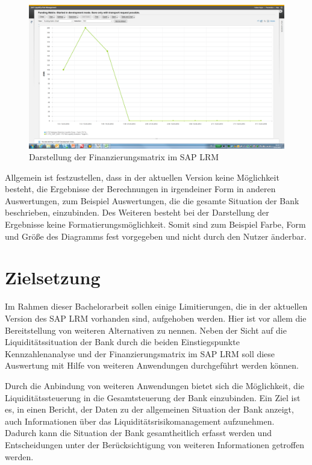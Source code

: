 \begin{onehalfspacing}
\begin{figure}[h]
\centering
\setlength{\unitlength}{1mm}
\includegraphics[width=15cm]{images/Funding_Matrix_Example.png}
\caption{Darstellung der Finanzierungsmatrix im SAP LRM\label{fig:lrm_istzustand_fundingmatrix}}
\end{figure} 

Allgemein ist festzustellen, dass in der aktuellen Version keine Möglichkeit besteht, die Ergebnisse der Berechnungen in irgendeiner Form in anderen Auswertungen, zum Beispiel Auswertungen, die die gesamte Situation der Bank beschrieben, einzubinden. Des Weiteren besteht bei der Darstellung der Ergebnisse keine Formatierungsmöglichkeit. Somit sind zum Beispiel Farbe, Form und Größe des Diagramms fest vorgegeben und nicht durch den Nutzer änderbar.

\section{Zielsetzung}
\label{sec:zielsetzung}

Im Rahmen dieser Bachelorarbeit sollen einige Limitierungen, die in der aktuellen Version des SAP LRM vorhanden sind, aufgehoben werden. Hier ist vor allem die Bereitstellung von weiteren Alternativen zu nennen. Neben der Sicht auf die Liquiditätssituation der Bank durch die beiden Einstiegspunkte Kennzahlenanalyse und der Finanzierungsmatrix im SAP LRM soll diese Auswertung mit Hilfe von weiteren Anwendungen durchgeführt werden können.

Durch die Anbindung von weiteren Anwendungen bietet sich die Möglichkeit, die  Liquiditätssteuerung in die Gesamtsteuerung der Bank einzubinden. Ein Ziel ist es, in einen Bericht, der Daten zu der allgemeinen Situation der Bank anzeigt, auch Informationen über das Liquiditätsrisikomanagement aufzunehmen. Dadurch kann die Situation der Bank gesamtheitlich erfasst werden und Entscheidungen unter der Berücksichtigung von weiteren Informationen getroffen werden.


\end{onehalfspacing}
